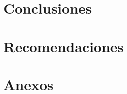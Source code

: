 \documentclass[11pt, letterpaper, twoside, openright]{report}
\newcommand{\defaultparformat}[1]{
	{\setlength{\parskip}{2ex}
     }
}
\begin{document}
	\chapter{Conclusiones}
	\ifdefined\parpordefecto
		\defaultparformat{m-conclusiones}
	\else
		
	\fi
\fi

\ifdefined\CAPrecomendaciones
	\newpage
	\chapter{Recomendaciones}
	\ifdefined\parpordefecto
		\defaultparformat{n-recomendaciones}
	\else
		
	\fi
\fi

\ifdefined\CAPbibliografia
	\newpage
    \cleardoublepage{}
	\chapter{\bibname}
    \printbibliography[heading=none]
\fi

\ifdefined\CAPanexos
	\newpage
	\chapter{Anexos}
	\ifdefined\parpordefecto
		\defaultparformat{p-anexos}
	\else
		
	\fi
\fi

\ifdefined\CAPglosario
	\newpage
	\cleardoublepage{}
	\printglossary[title=Glosario, toctitle=Glosario]
\fi
\end{document}
